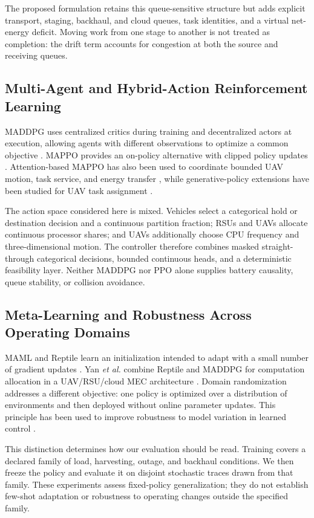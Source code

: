 The proposed formulation retains this queue-sensitive structure but adds
explicit transport, staging, backhaul, and cloud queues, task identities, and
a virtual net-energy deficit. Moving work from one stage to another is not
treated as completion: the drift term accounts for congestion at both the
source and receiving queues.

\subsection{Multi-Agent and Hybrid-Action Reinforcement Learning}
MADDPG uses centralized critics during training and decentralized actors at
execution, allowing agents with different observations to optimize a common
objective \cite{lowe2017multi}. MAPPO provides an on-policy alternative with
clipped policy updates \cite{schulman2017proximal}. Attention-based MAPPO has
also been used to coordinate bounded UAV motion, task service, and energy
transfer \cite{talukdar2026mappo}, while generative-policy extensions have
been studied for UAV task assignment \cite{tang2025dnn}.

The action space considered here is mixed. Vehicles select a categorical
hold or destination decision and a continuous partition fraction; RSUs and
UAVs allocate continuous processor shares; and UAVs additionally choose CPU
frequency and three-dimensional motion. The controller therefore combines
masked straight-through categorical decisions, bounded continuous heads,
and a deterministic feasibility layer. Neither MADDPG nor PPO alone supplies
battery causality, queue stability, or collision avoidance.

\subsection{Meta-Learning and Robustness Across Operating Domains}
MAML and Reptile learn an initialization intended to adapt with a small
number of gradient updates \cite{finn2017model,nichol2018reptile}. Yan
\emph{et al.} combine Reptile and MADDPG for computation allocation in a
UAV/RSU/cloud MEC architecture \cite{yan2026rmaddpg}. Domain randomization
addresses a different objective: one policy is optimized over a distribution
of environments and then deployed without online parameter updates. This
principle has been used to improve robustness to model variation in learned
control \cite{tobin2017domain,peng2018sim}.

This distinction determines how our evaluation should be read. Training
covers a declared family of load, harvesting, outage, and backhaul
conditions. We then freeze the policy and evaluate it on disjoint stochastic
traces drawn from that family. These experiments assess fixed-policy
generalization; they do not establish few-shot adaptation or robustness to
operating changes outside the specified family.

